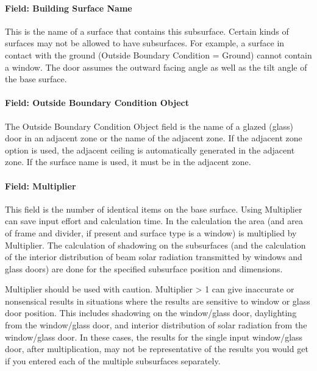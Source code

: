 \paragraph{Field: Building Surface Name}\label{field-building-surface-name-5}

This is the name of a surface that contains this subsurface. Certain kinds of surfaces may not be allowed to have subsurfaces. For example, a surface in contact with the ground (Outside Boundary Condition = Ground) cannot contain a window. The door assumes the outward facing angle as well as the tilt angle of the base surface.

\paragraph{Field: Outside Boundary Condition Object}\label{field-outside-boundary-condition-object-5}

The Outside Boundary Condition Object field is the name of a glazed (glass) door in an adjacent zone or the name of the adjacent zone. If the adjacent zone option is used, the adjacent ceiling is automatically generated in the adjacent zone. If the surface name is used, it must be in the adjacent zone.

\paragraph{Field: Multiplier}\label{field-multiplier-6}

This field is the number of identical items on the base surface. Using Multiplier can save input effort and calculation time. In the calculation the area (and area of frame and divider, if present and surface type is a window) is multiplied by Multiplier. The calculation of shadowing on the subsurfaces (and the calculation of the interior distribution of beam solar radiation transmitted by windows and glass doors) are done for the specified subsurface position and dimensions.

Multiplier should be used with caution. Multiplier \textgreater{} 1 can give inaccurate or nonsensical results in situations where the results are sensitive to window or glass door position. This includes shadowing on the window/glass door, daylighting from the window/glass door, and interior distribution of solar radiation from the window/glass door. In these cases, the results for the single input window/glass door, after multiplication, may not be representative of the results you would get if you entered each of the multiple subsurfaces separately.

